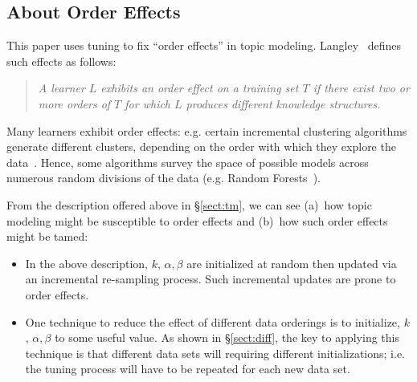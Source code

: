 \documentclass[twocolumn,5p,sort&compress]{elsarticle}
\newcommand{\tion}[1]{{\S}\ref{sect:#1}}
\newcommand{\bi}{\begin{itemize}}
\newcommand{\ei}{\end{itemize}}
\theoremstyle{break}
\begin{document}
\subsection{About Order Effects}

\noindent
This paper uses tuning to fix ``order effects'' in topic modeling. Langley~\cite{GENNARI198911} defines such effects as follows:
\begin{quote}
{\em A learner $L$ exhibits an order effect on a training set  $T$ if there exist
two or more orders of $T$ for which $L$ produces different knowledge structures.}
\end{quote}
Many learners exhibit order effects: e.g. certain incremental clustering algorithms generate different
clusters, depending on the order with which they explore the data~\cite{GENNARI198911}.
Hence, some algorithms survey the space of possible models across numerous
random divisions of the data (e.g. Random Forests~\cite{Breiman2001}).

From the description offered above in \S\ref{sect:tm},
we can see (a)~how topic modeling might be susceptible to order effects and (b)~how such order
effects might be tamed:
\bi
\item
  In the above description, $k$, $\alpha,\beta$ are initialized at random
then updated via an incremental re-sampling process. Such incremental updates are prone to order effects.
\item
  One technique to reduce the effect of different data orderings is to initialize, $k$, $\alpha,\beta$ to some
  useful value. As shown in \tion{diff},
the key to  applying this technique is that different data sets will requiring different
  initializations; i.e. the tuning process will have to be repeated for each new data set.
\ei
  





\end{document}

